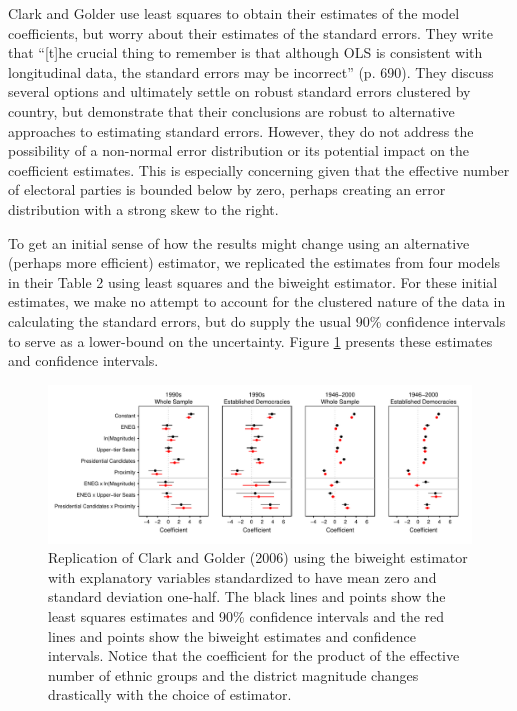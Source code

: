 \documentclass[12pt]{article}
\begin{document}
Clark and Golder use least squares to obtain their estimates of the model coefficients, but worry about their estimates of the standard errors. They write that ``[t]he crucial thing to remember is that although OLS is consistent with longitudinal data, the standard errors may be incorrect'' (p. 690). They discuss several options and ultimately settle on robust standard errors clustered by country, but demonstrate that their conclusions are robust to alternative approaches to estimating standard errors. However, they do not address the possibility of a non-normal error distribution or its potential impact on the coefficient estimates. This is especially concerning given that the effective number of electoral parties is bounded below by zero, perhaps creating an error distribution with a strong skew to the right. 

To get an initial sense of how the results might change using an alternative (perhaps more efficient) estimator, we replicated the estimates from four models in their Table 2 using least squares and the biweight estimator. For these initial estimates, we make no attempt to account for the clustered nature of the data in calculating the standard errors, but do supply the usual 90\% confidence intervals to serve as a lower-bound on the uncertainty. Figure \ref{fig:cg-coef-plots} presents these estimates and confidence intervals.

\begin{figure}[h!]
\begin{center}
\includegraphics[scale = .8]{figs/cg-coef-plots.pdf}
\caption{Replication of Clark and Golder (2006) using the biweight estimator with explanatory variables standardized to have mean zero and standard deviation one-half. The black lines and points show the least squares estimates and 90\% confidence intervals and the red lines and points show the biweight estimates and confidence intervals. Notice that the coefficient for the product of the effective number of ethnic groups and the district magnitude changes drastically with the choice of estimator.}\label{fig:cg-coef-plots}
\end{center}
\end{figure}
\end{document}
